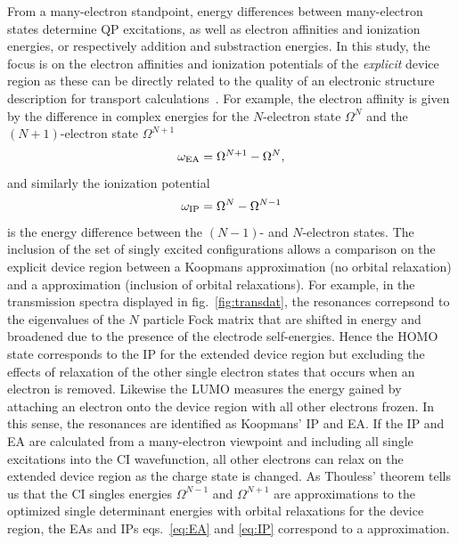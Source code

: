 From a many-electron standpoint, energy differences between many-electron
states determine \ac{QP} excitations, as well as electron affinities
and ionization energies, or respectively addition and substraction energies. 
In this study, the focus is on the electron affinities and ionization
potentials of the {\it explicit} device region as these can be directly
related to the quality of an electronic structure description for transport
calculations~\cite{golden}. For example, the electron affinity is given
by the difference in complex energies for the $N$-electron state $\Omega^N$
and the $(N+1)$-electron state $\Omega^{N+1}$
\numparts
\begin{equation}
\label{eq:EA}
\omega_{\rm EA} = \Omega^{N+1} -\Omega^N,
\end{equation}
and similarly the ionization potential
\begin{equation}
\label{eq:IP}
\omega_{\rm IP} =  \Omega^N - \Omega^{N-1}
\end{equation}
\endnumparts
is the energy difference between the $(N-1)$- and $N$-electron states.
The inclusion of the set of singly excited configurations allows a
comparison on the explicit device region between a Koopmans approximation 
(no orbital relaxation) and a \dscf approximation (inclusion of
orbital relaxations).  For example, in the transmission spectra displayed
in fig.~\ref{fig:transdat}, the resonances correpsond to the eigenvalues of
the $N$ particle Fock matrix that are shifted in energy and broadened due
to the presence of the electrode self-energies. Hence the \ac{HOMO} state
corresponds to the IP for the extended device region but excluding the
effects of relaxation of the other single electron states that occurs
when an electron is removed. Likewise the LUMO measures the energy gained
by attaching an electron onto the device region with all other electrons
frozen. In this sense, the resonances are identified as Koopmans' IP and
EA. If the IP and EA are calculated from a many-electron viewpoint and
including all single excitations into the CI wavefunction,
all other electrons can relax on the extended device region as the charge
state is changed. As Thouless' theorem tells us that the CI singles
energies $\Omega^{N-1}$ and $\Omega^{N+1}$ are approximations to the optimized
single determinant energies with orbital relaxations for the device region,
the EAs and IPs eqs.~\ref{eq:EA} and \ref{eq:IP} correspond to a \dscf
approximation. 

